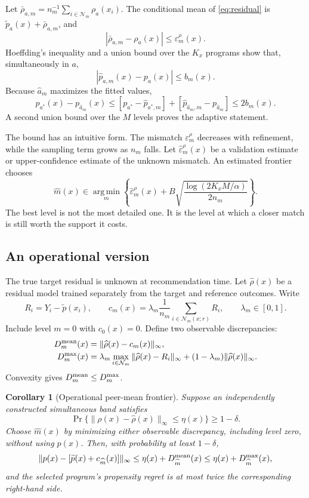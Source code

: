 \documentclass[10pt]{article}
\makeatletter
\theoremstyle{noteplain}
\newtheorem{corollary}[theorem]{Corollary}
\theoremstyle{definition}
\renewenvironment{proof}[1][\proofname]{\par
  \pushQED{\qed}%
  \normalfont \topsep4\p@\@plus4\p@\relax
  \trivlist
  \item[\hskip\labelsep\bfseries #1\@addpunct{.}]\ignorespaces
}{\popQED\endtrivlist\@endpefalse}
\newcommand{\cN}{\mathcal N}
\newcommand{\argmin}{\operatorname*{arg\,min}}
\makeatother
\begin{document}
\begin{proof}
Let $\bar\rho_{a,m}=n_m^{-1}\sum_{i\in\cN_m}\rho_a(x_i)$. The conditional mean of \eqref{eq:residual} is $\widetilde p_a(x)+\bar\rho_{a,m}$, and
\[
 |\bar\rho_{a,m}-\rho_a(x)|\le\varepsilon_m^\rho(x).
\]
Hoeffding's inequality and a union bound over the $K_x$ programs show that, simultaneously in $a$,
\[
 |\widehat p_{a,m}(x)-p_a(x)|\le b_m(x).
\]
Because $\widehat a_m$ maximizes the fitted values,
\[
 p_{a^*}(x)-p_{\widehat a_m}(x)
 \le[p_{a^*}-\widehat p_{a^*,m}]
 +[\widehat p_{\widehat a_m,m}-p_{\widehat a_m}]
 \le2b_m(x).
\]
A second union bound over the $M$ levels proves the adaptive statement.
\end{proof}

The bound has an intuitive form. The mismatch $\varepsilon_m^\rho$ decreases with refinement, while the sampling term grows as $n_m$ falls. Let $\widehat\varepsilon_m^\rho(x)$ be a validation estimate or upper-confidence estimate of the unknown mismatch. An estimated frontier chooses
\begin{equation}\label{eq:rule}
 \widehat m(x)\in\argmin_m
 \left\{
 \widehat\varepsilon_m^\rho(x)
 +B\sqrt{\frac{\log(2K_xM/\alpha)}{2n_m}}
 \right\}.
\end{equation}
The best level is not the most detailed one. It is the level at which a closer match is still worth the support it costs.

\subsection{An operational version}

The true target residual is unknown at recommendation time. Let $\widehat\rho(x)$ be a residual model trained separately from the target and reference outcomes. Write
\[
 R_i=Y_i-\widetilde p(x_i),
 \qquad
 c_m(x)=\lambda_m\frac{1}{n_m}\sum_{i\in\cN_m(x;r)}R_i,
 \qquad \lambda_m\in[0,1].
\]
Include level $m=0$ with $c_0(x)=0$. Define two observable discrepancies:
\begin{align*}
 D_m^{\rm mean}(x)&=\|\widehat\rho(x)-c_m(x)\|_\infty,\\
 D_m^{\rm max}(x)&=\lambda_m\max_{i\in\cN_m}
 \|\widehat\rho(x)-R_i\|_\infty
 +(1-\lambda_m)\|\widehat\rho(x)\|_\infty.
\end{align*}
Convexity gives $D_m^{\rm mean}\le D_m^{\rm max}$.

\begin{corollary}[Operational peer-mean frontier]\label{cor:operational}
Suppose an independently constructed simultaneous band satisfies
\[
 \Pr\{\|\rho(x)-\widehat\rho(x)\|_\infty\le\eta(x)\}\ge1-\delta.
\]
Choose $\widehat m(x)$ by minimizing either observable discrepancy, including level zero, without using $p(x)$. Then, with probability at least $1-\delta$,
\[
 \|p(x)-[\widetilde p(x)+c_{\widehat m}(x)]\|_\infty
 \le\eta(x)+D_{\widehat m}^{\rm mean}(x)
 \le\eta(x)+D_{\widehat m}^{\rm max}(x),
\]
and the selected program's propensity regret is at most twice the corresponding right-hand side.
\end{corollary}
\end{document}
